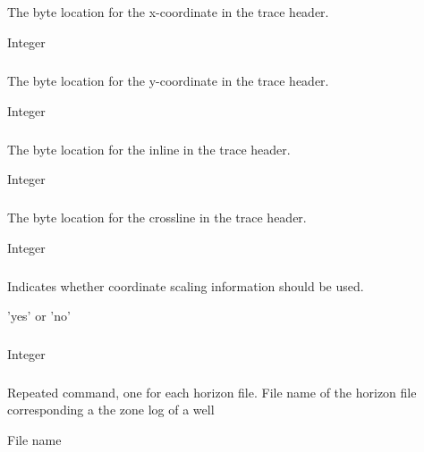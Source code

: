 \subparagraph{}
 \slist
   \item \Description The byte location for the x-coordinate in the trace header.
   \item \Argument Integer
   \item \Default
 \elist

\subparagraph{}
 \slist
   \item \Description The byte location for the y-coordinate in the trace header.
   \item \Argument Integer
   \item \Default
 \elist

\subparagraph{}
 \slist
   \item \Description The byte location for the inline in the trace header.
   \item \Argument Integer
   \item \Default
 \elist

\subparagraph{}
 \slist
   \item \Description The byte location for the crossline in the trace header.
   \item \Argument Integer
   \item \Default
 \elist

\subparagraph{}
 \slist
   \item \Description Indicates whether coordinate scaling information should be used.
   \item \Argument 'yes' or 'no'
   \item \Default
 \elist

\subparagraph{}
 \slist
   \item \Description
   \item \Argument Integer
   \item \Default
 \elist

\subsubsection{}
 \slist
   \item \Description Repeated command, one for each horizon file. File name of the horizon file corresponding a the zone log of a well
   \item \Argument File name
   \item \Default 
 \elist

